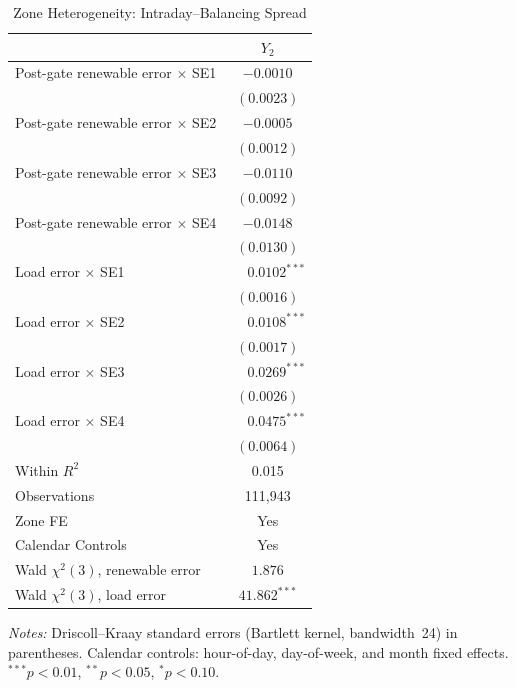 \documentclass{article}
\begin{document}
\begin{table}[htbp]
\centering
\caption{Zone Heterogeneity: Intraday--Balancing Spread}
\label{tab:6}
\begin{threeparttable}
\begin{tabularx}{\linewidth}{>{\raggedright\arraybackslash}Xc}
\toprule
 & $Y_2$ \\
\midrule
Post-gate renewable error $\times$ SE1 & $-0.0010$ \\
 & $(0.0023)$ \\[0.4ex]
Post-gate renewable error $\times$ SE2 & $-0.0005$ \\
 & $(0.0012)$ \\[0.4ex]
Post-gate renewable error $\times$ SE3 & $-0.0110$ \\
 & $(0.0092)$ \\[0.4ex]
Post-gate renewable error $\times$ SE4 & $-0.0148$ \\
 & $(0.0130)$ \\[0.4ex]
Load error $\times$ SE1 & $\phantom{-}0.0102^{***}$ \\
 & $(0.0016)$ \\[0.4ex]
Load error $\times$ SE2 & $\phantom{-}0.0108^{***}$ \\
 & $(0.0017)$ \\[0.4ex]
Load error $\times$ SE3 & $\phantom{-}0.0269^{***}$ \\
 & $(0.0026)$ \\[0.4ex]
Load error $\times$ SE4 & $\phantom{-}0.0475^{***}$ \\
 & $(0.0064)$ \\
\midrule
Within $R^2$ & 0.015 \\
Observations & 111,943 \\
Zone FE & Yes \\
Calendar Controls & Yes \\
Wald $\chi^2(3)$, renewable error & $1.876$ \\
Wald $\chi^2(3)$, load error & $41.862^{***}$ \\
\bottomrule
\end{tabularx}
\begin{tablenotes}[flushleft]
\footnotesize
\item \textit{Notes:} Driscoll--Kraay standard errors (Bartlett kernel, bandwidth~24) in parentheses. Calendar controls: hour-of-day, day-of-week, and month fixed effects. $^{***}p<0.01$, $^{**}p<0.05$, $^{*}p<0.10$.
\end{tablenotes}
\end{threeparttable}
\end{table}
\end{document}
